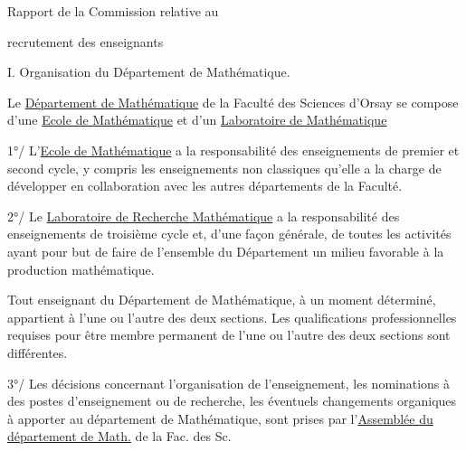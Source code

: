 
\begin{center}
Rapport de la Commission relative au

recrutement des enseignants
\end{center}

I. Organisation du Département de Mathématique.

Le \uline{Département de Mathématique} de la Faculté des Sciences d'Orsay se compose d'une \uline{Ecole de Mathématique} et d'un \uline{Laboratoire de Mathématique}

1°/ L'\uline{Ecole de Mathématique} a la responsabilité des enseignements de premier et second cycle, y compris les enseignements non classiques qu'elle a la charge de développer en collaboration avec les autres départements de la Faculté.

2°/ Le \uline{Laboratoire de Recherche Mathématique} a la responsabilité des enseignements de troisième cycle et, d'une façon générale, de toutes les activités ayant pour but de faire de l'ensemble du Département un milieu favorable à la production mathématique.

Tout enseignant du Département de Mathématique, à un moment déterminé, appartient à l'une ou l'autre des deux sections. Les qualifications professionnelles requises pour être membre permanent de l'une ou l'autre des deux sections sont différentes.

3°/ Les décisions concernant l'organisation de l'enseignement, les nominations à des postes d'enseignement ou de recherche, les éventuels changements organiques à apporter au département de Mathématique, sont prises par l'\uline{Assemblée du département de Math.} de la Fac. des Sc.
